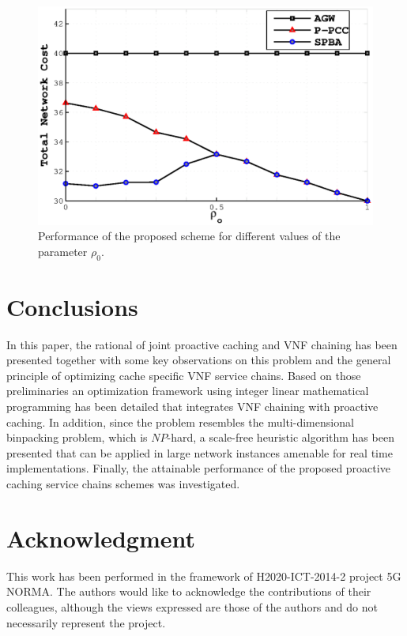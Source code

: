 \documentclass[journal]{IEEEtran}
\begin{document}
  \begin{figure}
    \includegraphics[width=1.1\columnwidth,trim=1.1cm 0.5cm 0cm 0.8cm]{mc_ppcc_naive_static_Rho_0_100_final.eps}
    \caption{Performance of the proposed scheme for different values of the parameter $\rho_0$.}
    \label{fig:cost_mobility}
  \end{figure}
  \section{Conclusions}
  In this paper, the rational of joint proactive caching and VNF chaining has been presented together with some key observations on this problem and the general principle of optimizing cache specific VNF service chains. Based on those preliminaries an optimization framework using integer linear mathematical programming has been detailed that integrates VNF chaining with proactive caching. In addition, since the problem resembles the multi-dimensional binpacking problem, which is $NP$-hard, a scale-free heuristic algorithm has been presented that can be applied in large network instances amenable for real time implementations. Finally, the attainable
  performance of the proposed proactive caching service chains schemes was investigated.

  \section*{Acknowledgment}
  This work has been performed in the framework of H2020-ICT-2014-2 project 5G NORMA. The authors would like to acknowledge the contributions of their colleagues, although the views expressed are those of the authors and do not necessarily represent the project.
\end{document}
